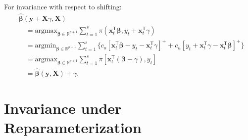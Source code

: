 \documentclass{article}
\begin{document}
\noindent
For invariance with respect to shifting:
\[
    \begin{aligned}
        &\hat{\boldsymbol{\beta}}(\mathbf{y}+\mathbf{X}\gamma,\mathbf{X})\\
        &\quad=\text{argmax}_{\boldsymbol{\beta}\in \mathbb{R}^{p+1}}\displaystyle\sum_{t=1}^s{\pi(\mathbf{x}_t^{\mathsf{T}}\boldsymbol{\beta},y_t+\mathbf{x}_t^{\mathsf{T}}\gamma)}\\
        &\quad=\text{argmin}_{\boldsymbol{\beta}\in \mathbb{R}^{p+1}}\displaystyle\sum_{t=1}^s{\{c_o[\mathbf{x}_t^{\mathsf{T}}\boldsymbol{\beta}-y_t-\mathbf{x}_t^{\mathsf{T}}\gamma]^{+}+c_u[y_t+\mathbf{x}_t^{\mathsf{T}}\gamma-\mathbf{x}_t^{\mathsf{T}}\boldsymbol{\beta}]^{+}\}}\\
        &\quad=\text{argmax}_{\boldsymbol{\beta}\in \mathbb{R}^{p+1}}\displaystyle\sum_{t=1}^s{\pi[\mathbf{x}_t^{\mathsf{T}}(\boldsymbol{\beta}-\gamma),y_t]}\\
        &\quad=\hat{\boldsymbol{\beta}}(\mathbf{y},\mathbf{X})+\gamma.
    \end{aligned}
\]

\section{Invariance under Reparameterization}
\label{app:B}
\end{document}
